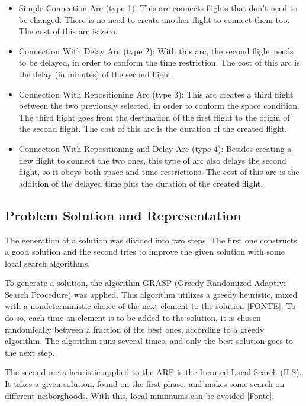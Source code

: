 \documentclass{endm}
\begin{document}
\begin{itemize}

\item Simple Connection Arc (type 1): This arc connects flights that don’t need to be changed. There is no need to create another flight to connect them too. The cost of this arc is zero.

\item Connection With Delay Arc (type 2): With this arc, the second flight needs to be delayed, in order to conform the time restriction. The cost of this arc is the delay (in minutes) of the second flight.

\item Connection With Repositioning Arc (type 3): This arc creates a third flight between the two previously selected, in order to conform the space condition. The third flight goes from the destination of the first flight to the origin of the second flight. The cost of this arc is the duration of the created flight.

\item Connection With Repositioning and Delay Arc (type 4): Besides creating a new flight to connect the two ones, this type of arc also delays the second flight, so it obeys both space and time restrictions. The cost of this arc is the addition of the delayed time plus the duration of the created flight.
\end{itemize}

\subsection{Problem Solution and Representation}

The generation of a solution was divided into two steps. The first one constructs a good solution and the second tries to improve the given solution with some local search algorithms.

To generate a solution, the algorithm GRASP (Greedy Randomized Adaptive Search Procedure) was applied. This algorithm utilizes a greedy heuristic, mixed with a nondeterministic choice of the next element to the solution [FONTE]. To do so, each time an element is to be added to the solution, it is chosen randomically between a fraction of the best ones, according to a greedy algorithm. The algorithm runs several times, and only the best solution goes to the next step.

The second meta-heuristic applied to the ARP is the Iterated Local Search (ILS). It takes a given solution, found on the first phase, and makes some search on different neiborghoods. With this, local minimums can be avoided [Fonte].
\end{document}
